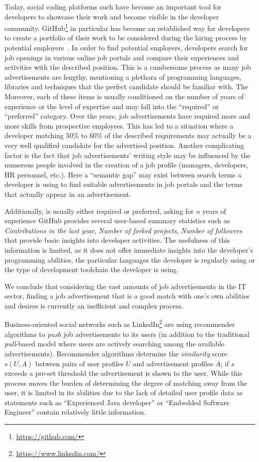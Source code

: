 \documentclass[conference]{IEEEtran}
\begin{document}
Today, social coding platforms such have become an important tool for developers to showcase their work and become visible in the developer community. GitHub\footnote{\url{https://github.com/}} in particular has become an established way for developers to create a portfolio of their work to be considered during the hiring process by potential employers~\cite{dabbish2012social}. In order to find potential employers, developers search for job openings in various online job portals and compare their experiences and activities with the described position. This is a cumbersome process as many job advertisements are lengthy, mentioning a plethora of programming languages, libraries and techniques that the perfect candidate should be familiar with. The  Moreover, each of these items is usually conditioned on the number of years of experience or the level of expertise and may fall into the ``required'' or ``preferred'' category. Over the years, job advertisements have required more and more skills from prospective employees. This has led to a situation where a developer matching $50\%$ to $60\%$ of the described requirements may actually be a very well qualified candidate for the advertised position. Another complicating factor is the fact that job advertisements' writing style may be influenced by the numerous people involved in the creation of a job profile (managers, developers, HR personnel, etc.). Here a ``semantic gap'' may exist between search terms a developer is using to find suitable advertisements in job portals and the terms that actually appear in an advertisement. 

Additionally,  is usually either required or preferred, asking for $n$ years of experience   GitHub provides several user-based summary statistics such as \emph{Contributions in the last year}, \emph{Number of forked projects}, \emph{Number of followers} that provide basic insights into developer activities. The usefulness of this information is limited, as it does not offer immediate insights into the developer's programming abilities, the particular languages the developer is regularly using or the type of development toolchain the developer is using. 

We conclude that considering the vast amounts of job advertisements in the IT sector, finding a job advertisement that is a good match with one's own abilities and desires is currently an inefficient and complex process. 

Business-oriented social networks such as LinkedIn\footnote{\url{https://www.linkedin.com/}} are using recommender algorithms to \emph{push} job advertisements to its users (in addition to the traditional \emph{pull}-based model where users are actively searching among the available advertisements). Recommender algorithms determine the \emph{similarity} score $s(U,A)$ between pairs of user profiles $U$ and advertisement profiles $A$; if $s$ exceeds a pre-set threshold the advertisement is shown to the user. While this process moves the burden of determining the degree of matching away from the user, it is limited in its abilities due to the lack of detailed user profile data as statements such as ``Experienced Java developer'' or ``Embedded Software Engineer'' contain relatively little information.
\end{document}
